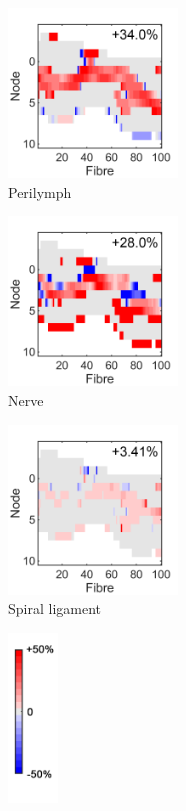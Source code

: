 \begin{figure}
    \vspace{0.8em}%
    \hfill%
    \begin{subfigure}[t]{0.3\textwidth}
        \centering
        \includegraphics[height=4.5cm]{Validation/delta_af-TR-peri}
        \caption{Perilymph}
        \label{fig:valid_delta_af_peri}
    \end{subfigure}%
    \begin{subfigure}[t]{0.3\textwidth}
        \centering
        \includegraphics[height=4.5cm]{Validation/delta_af-TR-nerve}
        \caption{Nerve}
        \label{fig:valid_delta_af_nerve}
    \end{subfigure}%
    \begin{subfigure}[t]{0.3\textwidth}
        \centering
        \includegraphics[height=4.5cm]{Validation/delta_af-TR-sl}
        \caption{Spiral ligament}
        \label{fig:valid_delta_af_sl}
    \end{subfigure}%
    \begin{subfigure}[t]{0.09\textwidth}
        \centering
        \includegraphics[height=4.5cm]{Validation/cbar_delta_af_short}
    \end{subfigure}%
    

\end{figure}
